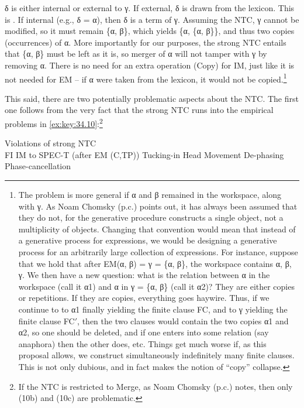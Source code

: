 \documentclass[output=paper]{langsci/langscibook}
\begin{document}
δ is either internal or external to γ. If external, δ is drawn from the
lexicon. This is . If internal (e.g., δ = α), then δ is a term of
γ.  Assuming the \gls{NTC}, γ cannot be modified, so it must remain \{α, β\},
which yields \{α, \{α, β\}\}, and thus two copies (occurrences) of α.  More
importantly for our purposes, the strong \gls{NTC} entails that \{α, β\} must be
left as it is, so merger of α will not tamper with γ by removing α.  There is
no need for an extra operation (Copy) for \gls{IM}, just like it is not needed for
\gls{EM} -- if α were taken from the lexicon, it would not be
copied.\footnote{The problem is more general if α and β remained in the
    workspace, along with γ. As Noam Chomsky (p.c.) points out, it has always
    been assumed that they do not, for the generative procedure constructs a
    single object, not a multiplicity of objects. Changing that convention
    would mean that instead of a generative process for expressions, we would
    be designing a generative process for an arbitrarily large collection of
    expressions. For instance, suppose that we hold that after \gls{EM}(α, β) =
    γ = \{α, β\}, the workspace contains α, β, γ. We then have a new question:
    what is the relation between α in the workspace (call it α1) and α in γ =
    \{α, β\} (call it α2)?  They are either copies or repetitions. If they are
    copies, everything goes haywire. Thus, if we continue to  to α1
    finally yielding the finite clause FC, and to γ yielding the finite clause
    FC$'$, then the two clauses would contain the two copies α1 and α2, so one
    should be deleted, and if one enters into some relation (say anaphora) then
    the other does, etc. Things get much worse if, as this proposal allows, we
construct simultaneously indefinitely many finite clauses. This is not only
dubious, and in fact makes the notion of \enquote{copy} collapse.}

This said, there are two potentially problematic aspects about the \gls{NTC}.
The first one follows from the very fact that the strong \gls{NTC} runs into
the empirical problems in \eqref{ex:key:34.10}:\footnote{If the \gls{NTC} is restricted to
Merge, as Noam Chomsky (p.c.) notes, then only (10b) and (10c) are
problematic.}

\ea%
    \label{ex:key:34.10} Violations of strong NTC\\
    \ea \glsdesc{FI} \parencite{Chomsky2008}
    \ex \gls{IM} to SPEC-T (after \gls{EM} (C,TP)) \parencite{Chomsky2008}
	\ex Tucking-in \parencite{Richards1997}
	\ex Head Movement \parencite{Chomsky2001}
	\ex De-phasing \parencite{Chomsky2015}
    \ex Phase-cancellation \parencite{EKS2016}
	\z
\z
\end{document}
